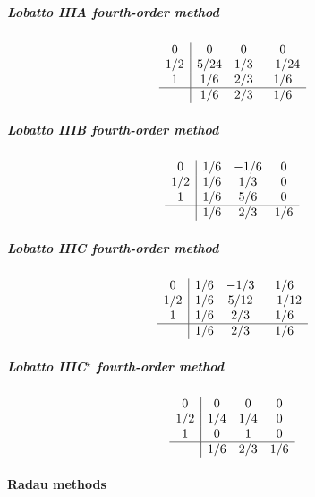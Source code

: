\subparagraph{Lobatto IIIA fourth-order method}
\begin{equation}
	\begin{array}{c|ccc}
		0   & 0   & 0   & 0     \\
		1/2 & 5/24& 1/3 & -1/24 \\
		1   & 1/6 & 2/3 & 1/6   \\ \hline
		    & 1/6 & 2/3 & 1/6
	\end{array}
	\label{eq::lobattoiia}
\end{equation}

\subparagraph{Lobatto IIIB fourth-order method}
\begin{equation}
	\begin{array}{c|ccc}
		 0  & 1/6 & -1/6 &  0  \\
		1/2 & 1/6 & 1/3  &  0  \\
		 1  & 1/6 & 5/6  &  0  \\ \hline
		    & 1/6 & 2/3  & 1/6
	\end{array}
	\label{eq::lobattoiib}
\end{equation}

\subparagraph{Lobatto IIIC fourth-order method}
\begin{equation}
	\begin{array}{c|ccc}
		 0  & 1/6 & -1/3 &  1/6  \\
		1/2 & 1/6 & 5/12 & -1/12 \\
		 1  & 1/6 & 2/3  &  1/6  \\ \hline
		    & 1/6 & 2/3  &  1/6
	\end{array}
	\label{eq::lobattoiic}
\end{equation}

\subparagraph{Lobatto IIIC$^\star$ fourth-order method}
\begin{equation}
	\begin{array}{c|ccc}
		 0  &  0  &  0  &  0  \\
		1/2 & 1/4 & 1/4 &  0  \\
		 1  &  0  &  1  &  0  \\ \hline
		    & 1/6 & 2/3 & 1/6
	\end{array}
	\label{eq::lobattoiic_star}
\end{equation}

\paragraph{Radau methods}

